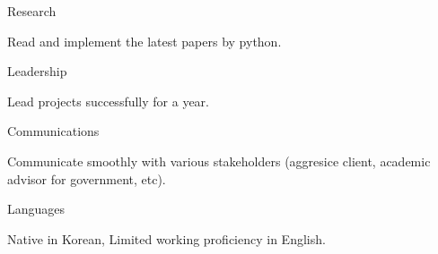 \begin{cvskills}
  \cvskill
    {Research} %
    {
      \begin{skillitems}
      \item {Read and implement the latest papers by python.}
      \end{skillitems}
    }

  \cvskill
    {Leadership} %
    {
      \begin{skillitems}
      \item {Lead projects successfully for a year.}
      \end{skillitems}
    }

  \cvskill
    {Communications} %
    {
      \begin{skillitems}
        \item {Communicate smoothly with various stakeholders (aggresice client, academic advisor for government, etc).}
      \end{skillitems}
    }

  \cvskill
    {Languages} %
    {
      \begin{skillitems}
        \item {Native in Korean, Limited working proficiency in English.}
      \end{skillitems}
    }

\end{cvskills}
